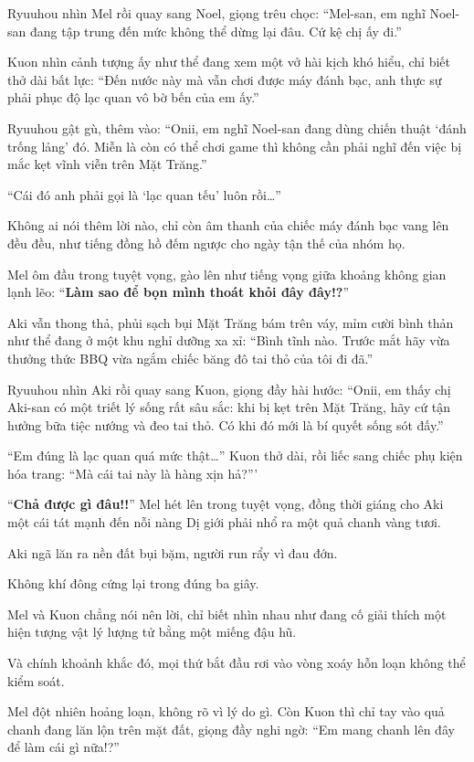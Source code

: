 \documentclass[../main.tex]{subfiles}
\begin{document}
Ryuuhou nhìn Mel rồi quay sang Noel, giọng trêu chọc: ``Mel-san, em nghĩ Noel-san đang tập trung đến mức không thể dừng lại đâu. Cứ kệ chị ấy đi.''

Kuon nhìn cảnh tượng ấy như thể đang xem một vở hài kịch khó hiểu, chỉ biết thở dài bất lực: ``Đến nước này mà vẫn chơi được máy đánh bạc, anh thực sự phải phục độ lạc quan vô bờ bến của em ấy.''

Ryuuhou gật gù, thêm vào: ``Onii, em nghĩ Noel-san đang dùng chiến thuật `đánh trống lảng' đó. Miễn là còn có thể chơi game thì không cần phải nghĩ đến việc bị mắc kẹt vĩnh viễn trên Mặt Trăng.''

``Cái đó anh phải gọi là `lạc quan tếu' luôn rồi\dots''

Không ai nói thêm lời nào, chỉ còn âm thanh của chiếc máy đánh bạc vang lên đều đều, như tiếng đồng hồ đếm ngược cho ngày tận thế của nhóm họ.

Mel ôm đầu trong tuyệt vọng, gào lên như tiếng vọng giữa khoảng không gian lạnh lẽo: ``\textbf{Làm sao để bọn mình thoát khỏi đây đây!?}''

Aki vẫn thong thả, phủi sạch bụi Mặt Trăng bám trên váy, mỉm cười bình thản như thể đang ở một khu nghỉ dưỡng xa xỉ: ``Bình tĩnh nào. Trước mắt hãy vừa thưởng thức BBQ vừa ngắm chiếc băng đô tai thỏ của tôi đi đã.''

Ryuuhou nhìn Aki rồi quay sang Kuon, giọng đầy hài hước: ``Onii, em thấy chị Aki-san có một triết lý sống rất sâu sắc: khi bị kẹt trên Mặt Trăng, hãy cứ tận hưởng bữa tiệc nướng và đeo tai thỏ. Có khi đó mới là bí quyết sống sót đấy.''

``Em đúng là lạc quan quá mức thật\dots'' Kuon thở dài, rồi liếc sang chiếc phụ kiện hóa trang: ``Mà cái tai này là hàng xịn hả?'''

``\textbf{Chả được gì đâu!!}'' Mel hét lên trong tuyệt vọng, đồng thời giáng cho Aki một cái tát mạnh đến nỗi nàng Dị giới phải nhổ ra một quả chanh vàng tươi.

Aki ngã lăn ra nền đất bụi bặm, người run rẩy vì đau đớn.


Không khí đông cứng lại trong đúng ba giây.

Mel và Kuon chẳng nói nên lời, chỉ biết nhìn nhau như đang cố giải thích một hiện tượng vật lý lượng tử bằng một miếng đậu hũ.

Và chính khoảnh khắc đó, mọi thứ bắt đầu rơi vào vòng xoáy hỗn loạn không thể kiểm soát.

Mel đột nhiên hoảng loạn, không rõ vì lý do gì. Còn Kuon thì chỉ tay vào quả chanh đang lăn lộn trên mặt đất, giọng đầy nghi ngờ: ``Em mang chanh lên đây để làm cái gì nữa!?''
\end{document}
